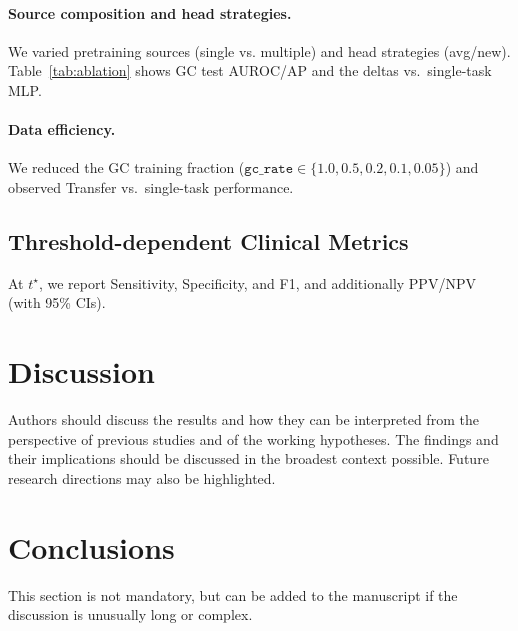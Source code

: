 \documentclass[diagnostics,article,submit,pdftex,moreauthors]{Definitions/mdpi}
\begin{document}
\paragraph{Source composition and head strategies.}
We varied pretraining sources (single vs. multiple) and head strategies (avg/new).
Table~\ref{tab:ablation} shows GC test AUROC/AP and the deltas vs.\ single-task MLP.


\paragraph{Data efficiency.}
We reduced the GC training fraction ($\texttt{gc\_rate}\in\{1.0,0.5,0.2,0.1,0.05\}$) and observed Transfer vs.\ single-task performance. %

\subsection{Threshold-dependent Clinical Metrics}
At $t^\star$, we report Sensitivity, Specificity, and F1, and additionally PPV/NPV (with 95\% CIs).


\section{Discussion}

Authors should discuss the results and how they can be interpreted from the perspective of previous studies and of the working hypotheses. The findings and their implications should be discussed in the broadest context possible. Future research directions may also be highlighted.

\section{Conclusions}

This section is not mandatory, but can be added to the manuscript if the discussion is unusually long or complex.

\vspace{6pt} 
\end{document}

